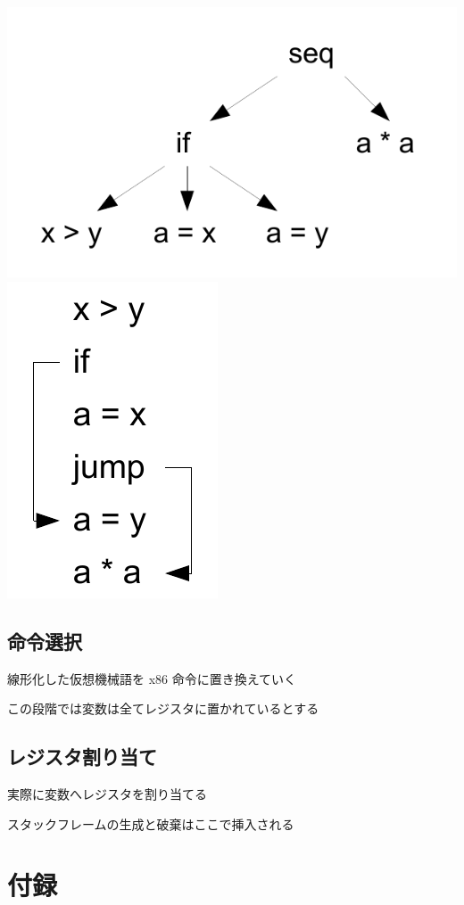 \documentclass[papersize,30pt,slide]{jsarticle}
\begin{document}
\includegraphics[scale=0.3]{instree.pdf}
\includegraphics[scale=0.3]{insliner.pdf}

\subsection{命令選択}
線形化した仮想機械語を x86 命令に置き換えていく

この段階では変数は全てレジスタに置かれているとする

\subsection{レジスタ割り当て}
実際に変数へレジスタを割り当てる

スタックフレームの生成と破棄はここで挿入される

\section{付録}
\end{document}
